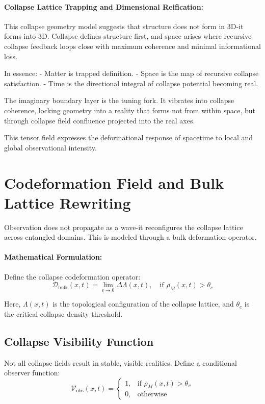 \paragraph{Collapse Lattice Trapping and Dimensional Reification:}
This collapse geometry model suggests that structure does not form in 3D-it forms into 3D. Collapse defines structure first, and space arises where recursive collapse feedback loops close with maximum coherence and minimal informational loss.

In essence:
- Matter is trapped definition.
- Space is the map of recursive collapse satisfaction.
- Time is the directional integral of collapse potential becoming real.

The imaginary boundary layer is the tuning fork. It vibrates into collapse coherence, locking geometry into a reality that forms not from within space, but through collapse field confluence projected into the real axes.

This tensor field expresses the deformational response of spacetime to local and global observational intensity.

\section*{Codeformation Field and Bulk Lattice Rewriting}
Observation does not propagate as a wave-it reconfigures the collapse lattice across entangled domains. This is modeled through a bulk deformation operator.

\paragraph{Mathematical Formulation:}
Define the collapse codeformation operator:
\begin{equation}
\mathcal{D}_{\text{bulk}}(x,t) = \lim_{\epsilon \to 0} \Delta \Lambda(x,t), \quad \text{if } \rho_M(x,t) > \theta_c
\end{equation}

Here, $\Lambda(x,t)$ is the topological configuration of the collapse lattice, and $\theta_c$ is the critical collapse density threshold.

\subsection*{Collapse Visibility Function}
Not all collapse fields result in stable, visible realities. Define a conditional observer function:
\begin{equation}
\mathcal{V}_{\text{obs}}(x,t) =
\begin{cases}
 1, & \text{if } \rho_M(x,t) > \theta_v \\
 0, & \text{otherwise}
\end{cases}
\end{equation}

